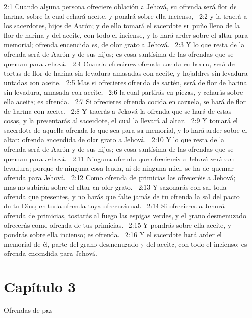 2:1 Cuando alguna persona ofreciere oblación a Jehová, su ofrenda será flor de harina, sobre la cual echará aceite, y pondrá sobre ella incienso,  
2:2 y la traerá a los sacerdotes, hijos de Aarón; y de ello tomará el sacerdote su puño lleno de la flor de harina y del aceite, con todo el incienso, y lo hará arder sobre el altar para memorial; ofrenda encendida es, de olor grato a Jehová.  
2:3 Y lo que resta de la ofrenda será de Aarón y de sus hijos; es cosa santísima de las ofrendas que se queman para Jehová.  
2:4 Cuando ofrecieres ofrenda cocida en horno, será de tortas de flor de harina sin levadura amasadas con aceite, y hojaldres sin levadura untadas con aceite.  
2:5 Mas si ofrecieres ofrenda de sartén, será de flor de harina sin levadura, amasada con aceite,  
2:6 la cual partirás en piezas, y echarás sobre ella aceite; es ofrenda.  
2:7 Si ofrecieres ofrenda cocida en cazuela, se hará de flor de harina con aceite.  
2:8 Y traerás a Jehová la ofrenda que se hará de estas cosas, y la presentarás al sacerdote, el cual la llevará al altar.  
2:9 Y tomará el sacerdote de aquella ofrenda lo que sea para su memorial, y lo hará arder sobre el altar; ofrenda encendida de olor grato a Jehová.  
2:10 Y lo que resta de la ofrenda será de Aarón y de sus hijos; es cosa santísima de las ofrendas que se queman para Jehová.  
2:11 Ninguna ofrenda que ofreciereis a Jehová será con levadura; porque de ninguna cosa leuda, ni de ninguna miel, se ha de quemar ofrenda para Jehová.  
2:12 Como ofrenda de primicias las ofreceréis a Jehová; mas no subirán sobre el altar en olor grato.  
2:13 Y sazonarás con sal toda ofrenda que presentes, y no harás que falte jamás de tu ofrenda la sal del pacto de tu Dios; en toda ofrenda tuya ofrecerás sal.  
2:14 Si ofrecieres a Jehová ofrenda de primicias, tostarás al fuego las espigas verdes, y el grano desmenuzado ofrecerás como ofrenda de tus primicias.  
2:15 Y pondrás sobre ella aceite, y pondrás sobre ella incienso; es ofrenda.  
2:16 Y el sacerdote hará arder el memorial de él, parte del grano desmenuzado y del aceite, con todo el incienso; es ofrenda encendida para Jehová.  
\section*{Capítulo 3}
Ofrendas de paz  

